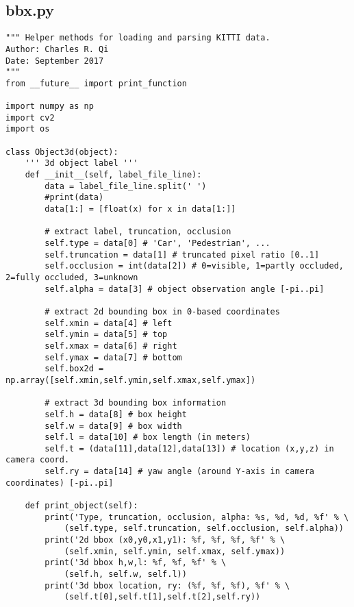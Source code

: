 \subsection*{bbx.py}
\begin{verbatim}
""" Helper methods for loading and parsing KITTI data.
Author: Charles R. Qi
Date: September 2017
"""
from __future__ import print_function

import numpy as np
import cv2
import os

class Object3d(object):
    ''' 3d object label '''
    def __init__(self, label_file_line):
        data = label_file_line.split(' ')
        #print(data)
        data[1:] = [float(x) for x in data[1:]]

        # extract label, truncation, occlusion
        self.type = data[0] # 'Car', 'Pedestrian', ...
        self.truncation = data[1] # truncated pixel ratio [0..1]
        self.occlusion = int(data[2]) # 0=visible, 1=partly occluded, 2=fully occluded, 3=unknown
        self.alpha = data[3] # object observation angle [-pi..pi]

        # extract 2d bounding box in 0-based coordinates
        self.xmin = data[4] # left
        self.ymin = data[5] # top
        self.xmax = data[6] # right
        self.ymax = data[7] # bottom
        self.box2d = np.array([self.xmin,self.ymin,self.xmax,self.ymax])
        
        # extract 3d bounding box information
        self.h = data[8] # box height
        self.w = data[9] # box width
        self.l = data[10] # box length (in meters)
        self.t = (data[11],data[12],data[13]) # location (x,y,z) in camera coord.
        self.ry = data[14] # yaw angle (around Y-axis in camera coordinates) [-pi..pi]

    def print_object(self):
        print('Type, truncation, occlusion, alpha: %s, %d, %d, %f' % \
            (self.type, self.truncation, self.occlusion, self.alpha))
        print('2d bbox (x0,y0,x1,y1): %f, %f, %f, %f' % \
            (self.xmin, self.ymin, self.xmax, self.ymax))
        print('3d bbox h,w,l: %f, %f, %f' % \
            (self.h, self.w, self.l))
        print('3d bbox location, ry: (%f, %f, %f), %f' % \
            (self.t[0],self.t[1],self.t[2],self.ry))



\end{verbatim}

